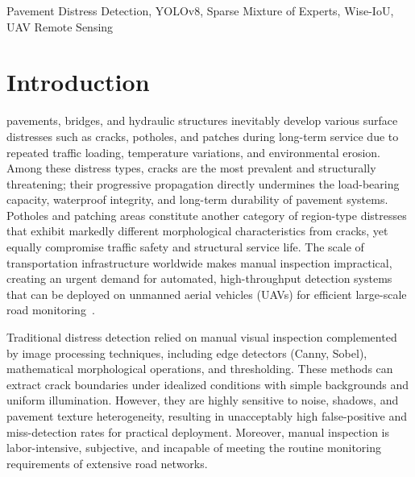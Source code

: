 \documentclass{ieeeaccess}
\begin{document}
\begin{keywords}
Pavement Distress Detection, YOLOv8, Sparse Mixture of Experts, Wise-IoU, UAV Remote Sensing
\end{keywords}

\titlepgskip=-15pt
\maketitle

\section{Introduction}

 pavements, bridges, and hydraulic structures inevitably develop various surface distresses such as cracks, potholes, and patches during long-term service due to repeated traffic loading, temperature variations, and environmental erosion. Among these distress types, cracks are the most prevalent and structurally threatening; their progressive propagation directly undermines the load-bearing capacity, waterproof integrity, and long-term durability of pavement systems. Potholes and patching areas constitute another category of region-type distresses that exhibit markedly different morphological characteristics from cracks, yet equally compromise traffic safety and structural service life. The scale of transportation infrastructure worldwide makes manual inspection impractical, creating an urgent demand for automated, high-throughput detection systems that can be deployed on unmanned aerial vehicles (UAVs) for efficient large-scale road monitoring~\cite{samadzadegan2024uavyolo, yang2025yolocompare, li2024mlyolo}.

Traditional distress detection relied on manual visual inspection complemented by image processing techniques, including edge detectors (Canny, Sobel), mathematical morphological operations, and thresholding. These methods can extract crack boundaries under idealized conditions with simple backgrounds and uniform illumination. However, they are highly sensitive to noise, shadows, and pavement texture heterogeneity, resulting in unacceptably high false-positive and miss-detection rates for practical deployment. Moreover, manual inspection is labor-intensive, subjective, and incapable of meeting the routine monitoring requirements of extensive road networks.
\end{document}
